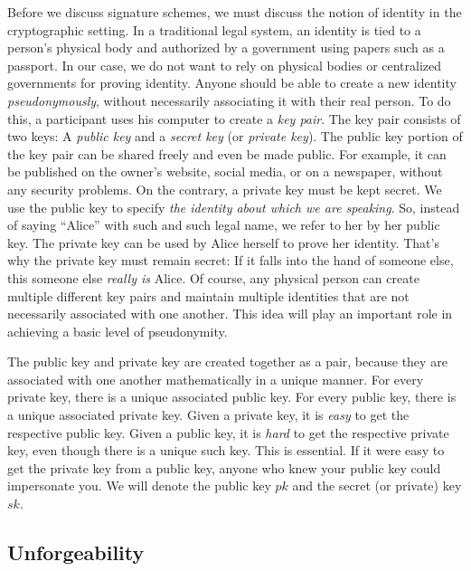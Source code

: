 Before we discuss signature schemes, we must discuss the notion of identity in the cryptographic
setting. In a traditional legal system, an identity is tied to a person's physical body
and authorized by a government using papers such as a passport. In our case, we do not want
to rely on physical bodies or centralized governments for proving identity. Anyone should be
able to create a new identity \emph{pseudonymously}, without necessarily associating it with
their real person. To do this, a participant uses his computer to create a \emph{key pair}.
The key pair consists of two keys: A \emph{public key} and a \emph{secret key}
(or \emph{private key}). The public key portion of the key pair can be shared freely and even
be made public. For example, it can be published on the owner's website, social media, or on
a newspaper, without any security problems. On the contrary, a private key must be kept secret.
We use the public key to specify \emph{the identity about which we are speaking}. So, instead
of saying ``Alice'' with such and such legal name, we refer to her by her public
key. The private key can be used by Alice herself to prove her identity. That's why the
private key must remain secret: If it falls into the hand of someone else, this someone
else \emph{really is} Alice. Of course, any physical person can create multiple different
key pairs and maintain multiple identities that are not necessarily associated with one
another. This idea will play an important role in achieving a basic level of pseudonymity.

The public key and private key are created together as a pair, because they are associated
with one another mathematically in a unique manner. For every private key, there is a unique
associated public key. For every public key, there is a unique associated private key.
Given a private key, it is \emph{easy} to get the respective public key. Given a public
key, it is \emph{hard} to get the respective private key, even though there is a unique
such key. This is essential. If it were easy to get the private key from a public key,
anyone who knew your public key could impersonate you. We will denote the public key
$pk$
and the secret (or private) key
$sk$.

\subsection*{Unforgeability}

